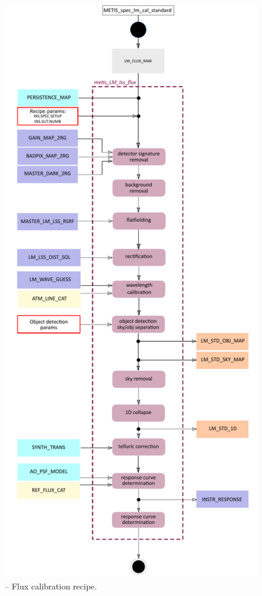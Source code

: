 \begin{figure}[ht]
  \centering
  \includegraphics[width=0.4\textheight]{figures/metis_lm_lss_flux_v0.71.pdf}
  \caption[Recipe: ]{ --
    Flux calibration recipe.}
  \label{Fig:rec_lm_lss_flux}
\end{figure}
